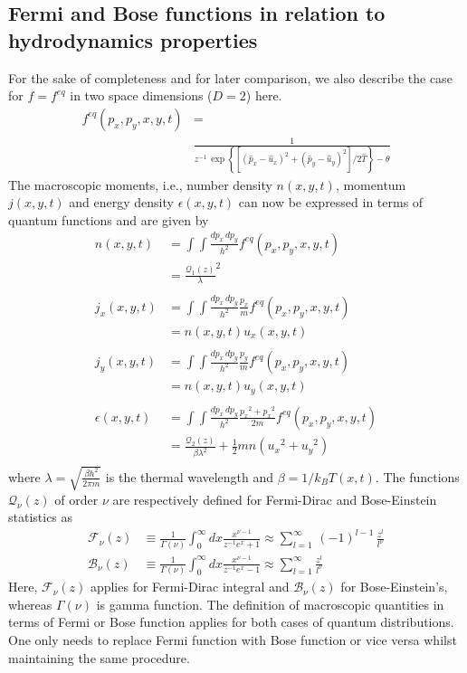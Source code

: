 \documentclass{rsproca}%
\begin{document}

\subsection{Fermi and Bose functions in relation to hydrodynamics properties}
\label{subsec:3_2}

For the sake of completeness and for later comparison, we also describe the case for $f=f^{eq}$ in two space dimensions ($D=2$) here.
\begin{align}
f^{eq}(p_x,p_y,x,y,t) &= \nonumber \\
&\frac{1}{z^{-1}\,\exp\left\{ \left[ (\hat{p}_x- \hat{u}_x)^2 + (\hat{p}_y- \hat{u}_y)^2 \right]/2\hat{T} \right\} -\theta}
\end{align}
The macroscopic moments, i.e., number density \(n(x,y,t)\), momentum \(j(x,y,t)\) and energy density \(\epsilon(x,y,t)\) can now be expressed in terms of quantum functions and are given by
\begin {align}
n(x,y,t) &= \int\int{\frac{dp_x\,dp_y}{h^2}f^{eq}(p_x,p_y,x,y,t)}\nonumber \\
&= \frac{\mathcal{Q}_{1}(z)}{\lambda}^2  \\
\nonumber \\
j_x(x,y,t) &= \int\int{\frac{dp_x\,dp_y}{h^2}\frac{p_x}{m}f^{eq}(p_x,p_y,x,y,t)}\nonumber \\
&= n(x,y,t)u_x(x,y,t)  \\
\nonumber \\
j_y(x,y,t) &= \int\int{\frac{dp_x\,dp_y}{h^2}\frac{p_y}{m}f^{eq}(p_x,p_y,x,y,t)}\nonumber \\
&= n(x,y,t)u_y(x,y,t)  \\
\nonumber \\
\epsilon(x,y,t) &= \int\int{\frac{dp_x\,dp_y}{h^2}\frac{{p_x}^2+{p_x}^2}{2m}f^{eq}(p_x,p_y,x,y,t)}\nonumber \\
&= \frac{\mathcal{Q}_{2}(z)}{\beta\lambda^2}+\frac{1}{2}mn({u_x}^2+{u_y}^2)\nonumber \\
\end{align}
where \(\lambda=\sqrt{\frac{\beta h^2}{2\pi m}}\) is the thermal wavelength and \(\beta=1/k_{B} T(x,t)\).  The functions $\mathcal{Q}_{\nu}(z)$ of order $\nu$ are respectively defined for Fermi-Dirac and Bose-Einstein statistics as
\begin {align}
\mathcal{F}_{\nu}(z)&\equiv \frac{1}{\Gamma(\nu)} \int^{\infty}_{0}{dx\frac{x^{\nu -1}}{z^{-1}e^{x} +1}}\approx\sum^{\infty}_{l=1}\,(-1)^{l-1}\,{\frac{z^l}{l^\nu}}\\
\mathcal{B}_{\nu}(z)&\equiv \frac{1}{\Gamma(\nu)} \int^{\infty}_{0}{dx\frac{x^{\nu-1}}{z^{-1}e^{x}-1}}\approx\sum^{\infty}_{l=1}{\frac{z^l}{l^\nu}}
\end{align}
Here,  \(\mathcal{F}_{\nu}(z)\) applies for Fermi-Dirac integral and \(\mathcal{B}_{\nu}(z)\) for Bose-Einstein's, whereas \(\Gamma(\nu)\) is gamma function. The definition of macroscopic quantities in terms of Fermi or Bose function applies for both cases of quantum distributions. One only needs to replace Fermi function with Bose function or vice versa whilst maintaining the same procedure.
\end{document}
